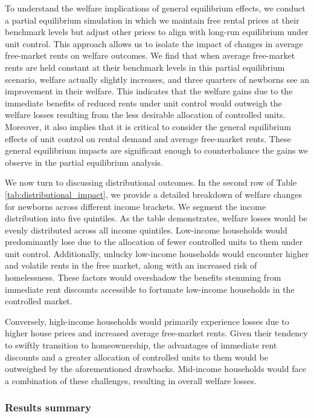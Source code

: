 \documentclass[parskip=full]{article}
\begin{document}
To understand the welfare implications of general equilibrium effects, we conduct a partial equilibrium simulation in which we maintain free rental prices at their benchmark levels but adjust other prices to align with long-run equilibrium under unit control. This approach allows us to isolate the impact of changes in average free-market rents on welfare outcomes. We find that when average free-market rents are held constant at their benchmark levels in this partial equilibrium scenario, welfare actually slightly increases, and three quarters of newborns see an improvement in their welfare. This indicates that the welfare gains due to the immediate benefits of reduced rents under unit control would outweigh the welfare losses resulting from the less desirable allocation of controlled units. Moreover, it also implies that it is critical to consider the general equilibrium effects of unit control on rental demand and average free-market rents. These general equilibrium impacts are significant enough to counterbalance the gains we observe in the partial equilibrium analysis.

We now turn to discussing distributional outcomes. In the second row of Table \ref{tab:distributional_impact}, we provide a detailed breakdown of welfare changes for newborns across different income brackets. We segment the income distribution into five quintiles. As the table demonstrates, welfare losses would be evenly distributed across all income quintiles. Low-income households would predominantly lose due to the allocation of fewer controlled units to them under unit control. Additionally, unlucky low-income households would encounter higher and volatile rents in the free market, along with an increased risk of homelessness. These factors would overshadow the benefits stemming from immediate rent discounts accessible to fortunate low-income households in the controlled market. 

Conversely, high-income households would primarily experience losses due to higher house prices and increased average free-market rents. Given their tendency to swiftly transition to homeownership, the advantages of immediate rent discounts and a greater allocation of controlled units to them would be outweighed by the aforementioned drawbacks. Mid-income households would face a combination of these challenges, resulting in overall welfare losses.

\subsubsection{Results summary}
\end{document}
